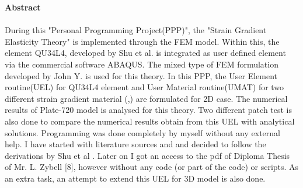 \documentclass[12pt]{article}
\begin{document}
	\clearpage
    \textbf{\LARGE Abstract}\\
    \\
    { \large During this "Personal Programming Project(PPP)", the "Strain Gradient Elasticity Theory" is implemented through the FEM model. Within this, the element QU34L4, developed by Shu et al. is integrated as user defined element via the commercial software ABAQUS. The mixed type of FEM formulation developed by John Y. \cite{shu1999finite} is used for this theory.
    In this PPP, the User Element routine(UEL) for QU34L4 element and User Material routine(UMAT) for two different strain gradient material (\cite{amanatidou2002mixed},\cite{shu1999finite}) are formulated for 2D case. The numerical results of Plate-720 model is analysed for this theory. Two different patch test is also done to compare the numerical results obtain from this UEL with analytical solutions. Programming was done completely by myself without any external help. I have started with literature sources \cite{amanatidou2002mixed} and \cite{shu1999finite} and decided to follow the derivations by Shu et al \cite{shu1999finite}. Later on I got an access to the pdf of Diploma Thesis of Mr. L. Zybell [8], however without any code (or part of the code) or scripts. As an extra task, an attempt to extend this UEL for 3D model is also done.}





    \newpage
    	\listoffigures
    	\listoftables
    \clearpage
    \tableofcontents
    \clearpage
\end{document}
